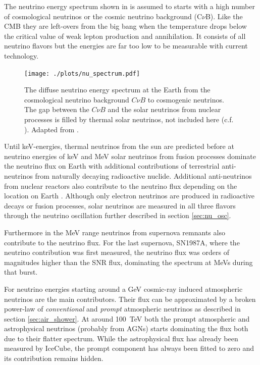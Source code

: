 The neutrino energy spectrum shown in  is assumed to starts with a high number of cosmological neutrinos or the cosmic neutrino background (C$\nu$B).
Like the CMB they are left-overs from the big bang when the temperature drops below the critical value of weak lepton production and annihilation.
It consists of all neutrino flavors but the energies are far too low to be measurable with current technology.
\begin{figure}
    \centering
    \texttt{[image: ./plots/nu\_spectrum.pdf]}
    \caption{The diffuse neutrino energy spectrum at the Earth from the cosmological neutrino background $C\nu B$ to cosmogenic neutrinos. The gap between the $C\nu B$ and the solar neutrinos from nuclear processes is filled by thermal solar neutrinos, not included here (c.f. \cite{Vitagliano20}). Adapted from \cite{KatzSpiering12}.}
    \label{fig:neutrino_spectrum}
\end{figure}

Until keV-energies, thermal neutrinos from the sun are predicted \cite{Vitagliano20} before at neutrino energies of keV and MeV solar neutrinos from fusion processes dominate the neutrino flux on Earth with additional contributions of terrestrial anti-neutrinos from naturally decaying radioactive nuclide.
Additional anti-neutrinos from nuclear reactors also contribute to the neutrino flux depending on the location on Earth \cite{Usman15}.
Although only electron neutrinos are produced in radioactive decays or fusion processes, solar neutrinos are measured in all three flavors through the neutrino oscillation further described in section \ref{sec:nu_osc}.

Furthermore in the MeV range neutrinos from supernova remnants also contribute to the neutrino flux.
For the last supernova, SN1987A, where the neutrino contribution was first measured, the neutrino flux was orders of magnitudes higher than the SNR flux, dominating the spectrum at MeVs during that burst.

For neutrino energies starting around a GeV cosmic-ray induced atmospheric neutrinos are the main contributors.
Their flux can be approximated by a broken power-law of \textit{conventional} and \textit{prompt} atmospheric neutrinos as described in section \ref{sec:air_shower}.
At around \SI{100}{TeV} both the prompt atmospheric and astrophysical neutrinos (probably from AGNs) starts dominating the flux both due to their flatter spectrum.
While the astrophysical flux has already been measured by IceCube, the prompt component has always been fitted to zero and its contribution remains hidden.

